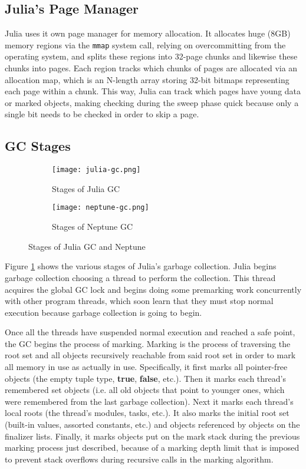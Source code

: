 \subsection{Julia's Page Manager}
Julia uses it own page manager for memory allocation.
It allocates huge (8GB) memory regions via the \texttt{mmap} system call, relying on overcommitting from the operating system, and splits these regions into 32-page chunks and likewise these chunks into pages.
Each region tracks which chunks of pages are allocated via an allocation map, which is an N-length array storing 32-bit bitmaps representing each page within a chunk.
This way, Julia can track which pages have young data or marked objects, making checking during the sweep phase quick because only a single bit needs to be checked in order to skip a page.

\subsection{GC Stages}
\begin{figure}[h]
  \centering
  \begin{subfigure}{0.45\textwidth}
    \texttt{[image: julia-gc.png]}
    \caption{Stages of Julia GC}
    \label{fig:stages:jl}
  \end{subfigure}
  \begin{subfigure}{0.45\textwidth}
    \texttt{[image: neptune-gc.png]}
    \caption{Stages of Neptune GC}
    \label{fig:stages:np}
  \end{subfigure}
  \caption{Stages of Julia GC and Neptune}
  \label{fig:stages}
\end{figure}

Figure \ref{fig:stages:jl} shows the various stages of Julia's garbage collection.
Julia begins garbage collection choosing a thread to perform the collection.
This thread acquires the global GC lock and begins doing some premarking work concurrently with other program threads, which soon learn that they must stop normal execution because garbage collection is going to begin.

Once all the threads have suspended normal execution and reached a safe point, the GC begins the process of marking.
Marking is the process of traversing the root set and all objects recursively reachable from said root set in order to mark all memory in use as actually in use.
Specifically, it first marks all pointer-free objects (the empty tuple type, \textbf{true}, \textbf{false}, etc.).
Then it marks each thread's remembered set objects (i.e. all old objects that point to younger ones, which were remembered from the last garbage collection).
Next it marks each thread's local roots (the thread's modules, tasks, etc.).
It also marks the initial root set (built-in values, assorted constants, etc.) and objects referenced by objects on the finalizer lists.
Finally, it marks objects put on the mark stack during the previous marking process just described, because of a marking depth limit that is imposed to prevent stack overflows during recursive calls in the marking algorithm.

